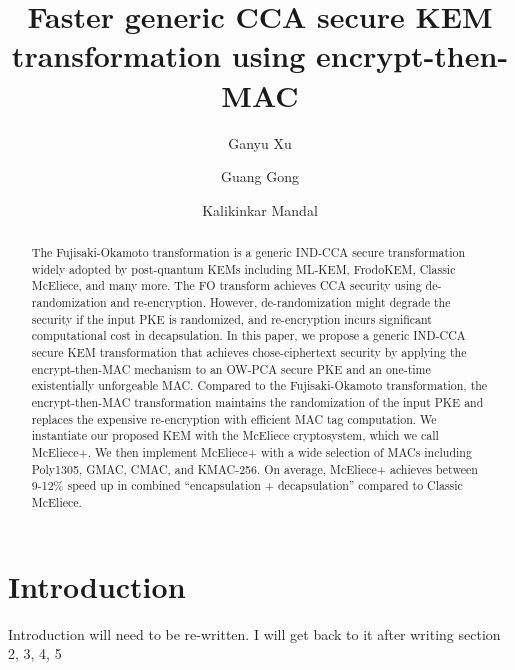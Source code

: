 \documentclass[runningheads]{llncs}
\begin{document}
%
\title{Faster generic CCA secure KEM transformation using encrypt-then-MAC}
%
%

\author{
    Ganyu Xu \and
    Guang Gong \and
    Kalikinkar Mandal
}
%


\maketitle              %
%
\begin{abstract}
    The Fujisaki-Okamoto transformation is a generic IND-CCA secure transformation widely adopted by post-quantum KEMs including ML-KEM, FrodoKEM, Classic McEliece, and many more. The FO transform achieves CCA security using de-randomization and re-encryption. However, de-randomization might degrade the security if the input PKE is randomized, and re-encryption incurs significant computational cost in decapsulation. In this paper, we propose a generic IND-CCA secure KEM transformation that achieves chose-ciphertext security by applying the encrypt-then-MAC mechanism to an OW-PCA secure PKE and an one-time existentially unforgeable MAC. Compared to the Fujisaki-Okamoto transformation, the encrypt-then-MAC transformation maintains the randomization of the input PKE and replaces the expensive re-encryption with efficient MAC tag computation. We instantiate our proposed KEM with the McEliece cryptosystem, which we call McEliece+. We then implement McEliece+ with a wide selection of MACs including Poly1305, GMAC, CMAC, and KMAC-256. On average, McEliece+ achieves between 9-12\% speed up in combined ``encapsulation + decapsulation'' compared to Classic McEliece.
\end{abstract}

\section{Introduction}\label{sec:introduction}
Introduction will need to be re-written. I will get back to it after writing section 2, 3, 4, 5
\end{document}
